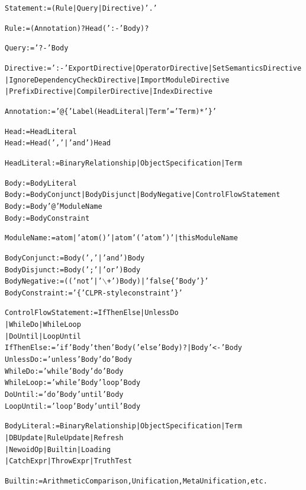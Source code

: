 \documentclass[11pt]{article}
\begin{document}
\begin{alltt}

Statement := (Rule | Query | Directive) '.'

Rule := (Annotation)? Head (':-' Body)?

Query := '?-' Body

Directive := ':-' ExportDirective | OperatorDirective | SetSemanticsDirective
	             | IgnoreDependencyCheckDirective | ImportModuleDirective
                     | PrefixDirective | CompilerDirective | IndexDirective

Annotation := '@\{' Label (HeadLiteral| Term '=' Term)* '\}'

Head := HeadLiteral
Head := Head (',' | 'and') Head

HeadLiteral := BinaryRelationship | ObjectSpecification | Term

Body := BodyLiteral
Body := BodyConjunct | BodyDisjunct | BodyNegative | ControlFlowStatement
Body := Body '@' ModuleName
Body := BodyConstraint

ModuleName := atom | 'atom()' | atom '(' atom ')' | thisModuleName

BodyConjunct := Body (',' | 'and') Body
BodyDisjunct := Body (';' | 'or') Body
BodyNegative := (('not' | '\ensuremath{\backslash}+') Body)  |  'false\{' Body '\}'
BodyConstraint := '\{' CLPR-style constraint '\}'

ControlFlowStatement  := IfThenElse | UnlessDo
                          | WhileDo | WhileLoop
                          | DoUntil | LoopUntil
IfThenElse := 'if' Body 'then' Body  ('else' Body)?  | Body '<-' Body
UnlessDo   := 'unless' Body 'do' Body
WhileDo    := 'while' Body 'do' Body
WhileLoop  := 'while' Body 'loop' Body
DoUntil    := 'do' Body 'until' Body
LoopUntil  := 'loop' Body 'until' Body

BodyLiteral := BinaryRelationship | ObjectSpecification | Term
                | DBUpdate | RuleUpdate | Refresh
                | NewoidOp | Builtin | Loading
                | CatchExpr | ThrowExpr | TruthTest

Builtin := ArithmeticComparison, Unification, MetaUnification, etc.


\end{alltt}
\end{document}
